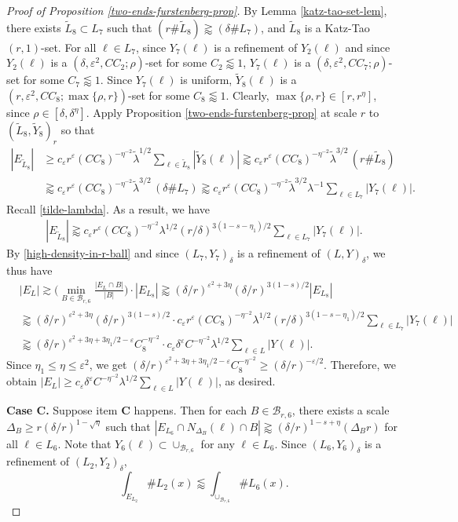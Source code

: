 \documentclass{amsart}
\numberwithin{equation}{section}
\newcommand{\de}{\delta}
\newcommand{\De}{\Delta}
\newcommand{\e}{\varepsilon}
\newcommand{\la}{\lambda}
\newcommand{\cb}{\mathcal B}
\begin{document}
\begin{proof}[Proof of Proposition \ref{two-ends-furstenberg-prop}]
By Lemma \ref{katz-tao-set-lem}, there exists $\tilde L_8\subset L_7$ such that $(r\# \tilde L_8)\gtrapprox (\de \# L_7)$, and $\tilde L_8$ is a Katz-Tao $(r,1)$-set. 
For all $\ell\in L_7$, since $Y_7(\ell)$ is a refinement of $Y_2(\ell)$ and since $Y_2(\ell)$ is a $(\de,\e^2,CC_2;\rho)$-set for some $C_2\lessapprox1$, $Y_7(\ell)$ is a $(\de,\e^2,CC_7;\rho)$-set for some $C_7\lessapprox1$.
Since $Y_7(\ell)$ is uniform, $\tilde Y_8(\ell)$ is a $(r,\e^2,CC_8;\max\{\rho,r\})$-set for some $C_8\lessapprox1$.
Clearly, $\max\{\rho,r\}\in[r,r^\eta]$, since $\rho\in[\de,\de^\eta]$.
Apply Proposition \ref{two-ends-furstenberg-prop} at scale $r$ to $(\tilde L_8, \tilde Y_8)_{r}$ so that
\begin{align}
    |E_{\tilde L_8}|&\geq c_\e r^{\e}(CC_8)^{-\eta^{-2}}  \tilde{\lambda}^{1/2} \sum_{\ell\in \tilde L_8}|\tilde Y_8(\ell)| \gtrapprox c_\e r^{\e}(CC_8)^{-\eta^{-2}} \tilde{\lambda}^{3/2}  \, (r \# \tilde L_8) \\
    &\gtrapprox c_\e r^{\e}(CC_8)^{-\eta^{-2}} \tilde{\lambda}^{3/2}  \, (\de \# L_7)\gtrapprox  c_\e r^{\e}(CC_8)^{-\eta^{-2}} \tilde{\lambda}^{3/2}  \lambda^{-1} \sum_{\ell \in L_7} |Y_7(\ell)|.
\end{align}
Recall \eqref{tilde-lambda}. As a result, we have
\begin{align}
    |E_{\tilde L_8}|\gtrapprox c_\e r^{\e}(CC_8)^{-\eta^{-2}}\la^{1/2}(r/\de)^{3(1-s-\eta_1)/2}\sum_{\ell\in L_7}|Y_7(\ell)|.
\end{align}
By \eqref{high-density-in-r-ball} and since $(L_7,Y_7)_\de$ is a refinement of $(L,Y)_\de$, we thus have
\begin{align}
    &|E_L| \gtrsim \big(\min_{B\in\cb_{r,6}}  \frac{  |E_L\cap B| }{|B|}\big) \cdot |E_{L_8}|  \gtrapprox (\de/r)^{\e^2+3\eta}(\de/r)^{3(1-s)/2}|E_{L_8}|\\[1ex]
    &\gtrapprox (\de/r)^{\e^2+3\eta}(\de/r)^{3(1-s)/2}\cdot c_\e r^{\e}(CC_8)^{-\eta^{-2}}\la^{1/2}(r/\de)^{3(1-s-\eta_1)/2}\sum_{\ell\in L_7}|Y_7(\ell)|\\
    &\gtrapprox (\de/r)^{\e^2+3\eta+3\eta_1/2-\e}C_8^{-\eta^{-2}}\cdot c_\e \de^{\e}C^{-\eta^{-2}}\la^{1/2}\sum_{\ell\in L}|Y(\ell)|.
\end{align}
Since $\eta_1\leq\eta\leq\e^2$, we get $(\de/r)^{\e^2+3\eta+3\eta_1/2-\e}C_8^{-\eta^{-2}}\geq (\de/r)^{-\e/2}$. 
Therefore, we obtain $|E_L|\geq c_\e \de^{\e}C^{-\eta^{-2}}\la^{1/2}\sum_{\ell\in L}|Y(\ell)|$, as desired.


\medskip


{\bf Case C.} Suppose item {\bf C} happens. Then for each $B\in\cb_{r,6}$,  there exists a scale $\De_B\geq r(\de/r)^{1-\sqrt{\eta}}$ such that $|E_{L_6}\cap N_{\De_B}(\ell)\cap B|\gtrapprox  (\de/r)^{1-s+\eta}(\De_B r)$ for all $\ell\in L_6$. 
Note that $Y_6(\ell)\subset\cup_{\cb_{r,6}}$ for any $\ell\in L_6$. 
Since $(L_6,Y_6)_\de$ is a refinement of $(L_2,Y_2)_\de$, 
\begin{equation}
    \int_{E_{L_2}}\# L_2(x)\lessapprox\int_{\cup_{\cb_{r,6}}}\# L_6(x).
\end{equation}


\end{proof}
\end{document}
